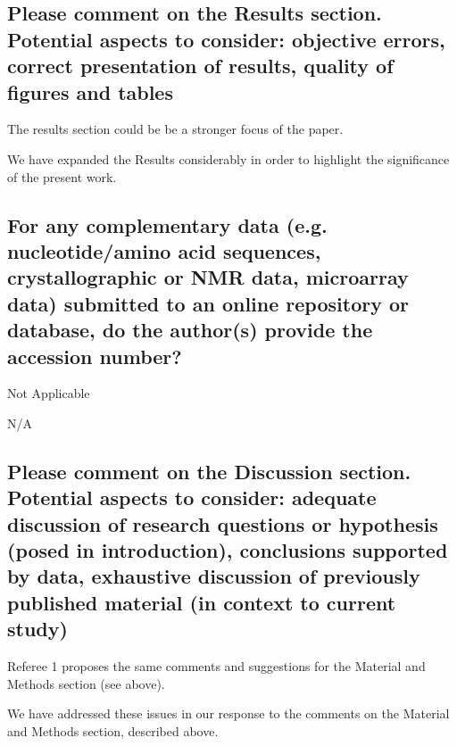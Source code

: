 \documentclass{article}
\begin{document}
\subsection{Please comment on the Results section. Potential aspects to
consider: objective errors, correct presentation of results, quality of figures
and tables}

The results section could be be a stronger focus of the paper.

\begin{shaded}
We have expanded the Results considerably in order to highlight the significance of the present work.
\end{shaded}


\subsection{For any complementary data (e.g. nucleotide/amino acid sequences,
crystallographic or NMR data, microarray data) submitted to an online repository
or database, do the author(s) provide the accession number?}

Not Applicable

\begin{shaded}
N/A
\end{shaded}


\subsection{Please comment on the Discussion section. Potential aspects to
consider: adequate discussion of research questions or hypothesis (posed in
introduction), conclusions supported by data, exhaustive discussion of
previously published material (in context to current study)}

Referee 1 proposes the same comments and suggestions for the Material and
Methods section (see above).

\begin{shaded}
We have addressed these issues in our response to the comments on the Material and Methods section, described above.
\end{shaded}

\end{document}
